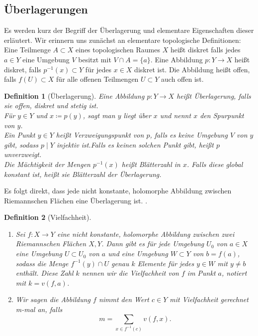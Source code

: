 \documentclass[11pt,a4paper]{scrartcl}
\theoremstyle{thm}
\theoremstyle{def}
\newtheorem{defi}{Definition}[section]
\theoremstyle{remark}
\begin{document}
\subsection{Überlagerungen}
Es werden kurz der Begriff der Überlagerung und elementare Eigenschaften dieser erläutert. Wir erinnern uns zunächst an elementare topologische Definitionen:\\
Eine Teilmenge $A\subset X$ eines topologischen Raumes $X$ heißt diskret falls jedes $a\in Y$ eine Umgebung $V$ besitzt mit $V\cap A= \{a\}$. Eine Abbildung $p:Y\rightarrow X$ heißt diskret, falls $p^{-1}(x)\subset Y$  für jedes $x\in X$ diskret ist. Die Abbildung heißt offen, falls $f(U)\subset X$ für alle offenen Teilmengen $U\subset Y$ auch offen ist.
\begin{defi}[Überlagerung]
Eine Abbildung $p:Y\rightarrow X$ heißt \emph{Überlagerung}, falls sie offen, diskret und stetig ist.\\
Für $y\in Y$ und $x\coloneqq p(y)$, sagt man \emph{$y$ liegt über $x$} und nennt $x$ den \emph{Spurpunkt} von $y$.\\
Ein Punkt $y\in Y$ heißt \emph{Verzweigungspunkt} von $p$, falls es keine Umgebung $V$ von $y$ gibt, sodass $p\mid Y$ injektiv ist.Falls es keinen solchen Punkt gibt, heißt $p$ \emph{unverzweigt}.\\
Die Mächtigkeit der Mengen $p^{-1}(x)$ heißt \emph{Blätterzahl in $x$}. Falls diese global konstant ist, heißt sie \emph{Blätterzahl} der Überlagerung.
\end{defi}
Es folgt direkt, dass jede nicht konstante, holomorphe Abbildung zwischen Riemannschen Flächen eine Überlagerung ist. \cite[S.18]{forster}.
\begin{defi}[Vielfachheit]
\begin{enumerate}
    \item
    Sei $f:X\rightarrow Y$ eine nicht konstante, holomorphe Abbildung zwischen zwei Riemannschen Flächen $X,Y$. Dann gibt es für jede Umgebung $U_0$ von $a\in X$ eine Umgebung $U\subset U_0$ von $a$ und eine Umgebung $W\subset Y$ von $b=f(a)$, sodass die Menge $f^{-1}(y)\cap U$ genau $k$ Elemente für jedes $y\in W$ mit $y\neq b$ enthält. Diese Zahl $k$ nennen wir die \emph{Vielfachheit} von $f$ im Punkt $a$, notiert mit $k=v(f,a)$.
    \item
    Wir sagen die Abbildung $f$ nimmt den Wert $c\in Y$ \emph{mit Vielfachheit gerechnet m-mal} an, falls
    \[
    m =\sum_{x\in f^{-1}(c)} v(f,x).
    \]
    \end{enumerate}
\end{defi}
\end{document}
